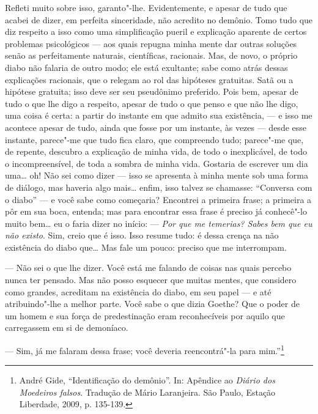 Refleti muito sobre isso, garanto"-lhe. Evidentemente, e apesar de tudo
que acabei de dizer, em perfeita sinceridade, não acredito no demônio.
Tomo tudo que diz respeito a isso como uma simplificação pueril e
explicação aparente de certos problemas psicológicos --- aos quais
repugna minha mente dar outras soluções senão as perfeitamente naturais,
científicas, racionais. Mas, de novo, o próprio diabo não falaria de
outro modo; ele está exultante; sabe como atrás dessas explicações
racionais, que o relegam ao rol das hipóteses gratuitas. Satã ou a
hipótese gratuita; isso deve ser seu pseudônimo preferido. Pois bem,
apesar de tudo o que lhe digo a respeito, apesar de tudo o que penso e
que não lhe digo, uma coisa é certa: a partir do instante em que admito
sua existência, --- e isso me acontece apesar de tudo, ainda que fosse por
um instante, às vezes --- desde esse instante, parece"-me que tudo fica
claro, que compreendo tudo; parece"-me que, de repente, descubro a
explicação de minha vida, de todo o inexplicável, de todo o
incompreensível, de toda a sombra de minha vida. Gostaria de escrever um
dia uma\ldots{} oh! Não sei como dizer --- isso se apresenta à minha mente
sob uma forma de diálogo, mas haveria algo mais\ldots{} enfim, isso talvez
se chamasse: ``Conversa com o diabo'' --- e você sabe como começaria?
Encontrei a primeira frase; a primeira a pôr em sua boca, entenda; mas
para encontrar essa frase é preciso já conhecê"-lo muito bem\ldots{} eu o
faria dizer no início: --- \emph{Por que me temerias? Sabes bem que eu não
existo}. Sim, creio que é isso. Isso resume tudo: é dessa crença na não
existência do diabo que\ldots{} Mas fale um pouco: preciso que me
interrompam.

--- Não sei o que lhe dizer. Você está me falando de coisas nas quais
percebo nunca ter pensado. Mas não posso esquecer que muitas mentes, que
considero como grandes, acreditam na existência do diabo, em seu papel
--- e até atribuindo"-lhe a melhor parte. Você sabe o que dizia Goethe?
Que o poder de um homem e sua força de predestinação eram reconhecíveis
por aquilo que carregassem em si de demoníaco.

--- Sim, já me falaram dessa frase; você deveria reencontrá"-la para
mim.''\footnote{André Gide, ``Identificação do demônio''. In:
  Apêndice ao \emph{Diário dos Moedeiros falsos}. Tradução de Mário
  Laranjeira. São Paulo, Estação Liberdade, 2009, p. 135-139. \versal{[N. T.]}}

